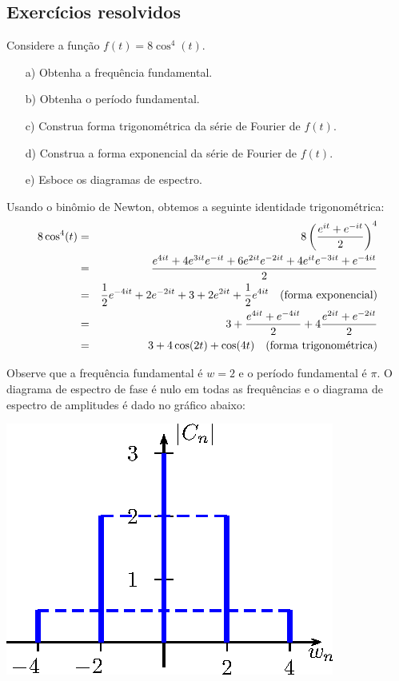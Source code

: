 \subsection*{Exercícios resolvidos}
\begin{exeresol}
 Considere a função $f(t)=8\cos^4(t)$. 
\begin{itemize}
 \item[a)] Obtenha a frequência fundamental.
 \item[b)] Obtenha o período fundamental.
 \item[c)] Construa forma trigonométrica da série de Fourier de $f(t)$.
 \item[d)] Construa a forma exponencial da série de Fourier de $f(t)$.
 \item[e)] Esboce os diagramas de espectro.
\end{itemize}
\end{exeresol}
\begin{resol}
Usando o binômio de Newton, obtemos a seguinte identidade trigonométrica:
\begin{eqnarray*}
8\cos^4(t)&=&8\left(\frac{e^{it}+e^{-it}}{2}\right)^4\\
&=&\frac{e^{4it}+ 4 e^{3it}e^{-it}+ 6 e^{2it}e^{-2it}+ 4 e^{it}e^{-3it} +e^{-4it} }{2} \\
&=&\frac{1}{2}e^{-4it}+2 e^{-2it}+3  + 2 e^{2it} +\frac{1}{2}e^{4it} \quad \hbox{(forma exponencial)}\\
&=&3+\frac{e^{4it}+e^{-4it} }{2}+4\frac{  e^{2it}+  e^{-2it} }{2}\\
&=&3+4\cos(2t)+\cos(4t)\quad \hbox{(forma trigonométrica)}\\
\end{eqnarray*}

Observe que a frequência fundamental é $w=2$ e o período fundamental é $\pi$. O diagrama de espectro de fase é nulo em todas as frequências e o diagrama de espectro de amplitudes é dado no gráfico abaixo:

\begin{center}
  \includegraphics{cap_diagramas_espectro/pics/diagrama_3}
\end{center}
\end{resol}


